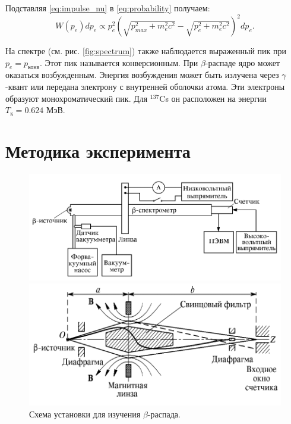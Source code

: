 \documentclass[12pt,a4paper]{article}
\newcommand{\figref}[1]{(см. рис. \ref{#1})}
\begin{document}
	Подставляя \eqref{eq:impulse_nu} в \eqref{eq:probability} получаем:
	\begin{equation}
		W(p_e) dp_e \propto p_e^2 (\sqrt{p_{max}^2 + m_e^2 c^2} - \sqrt{p_e^2 + m_e^2 c^2})^2 dp_e.
	\end{equation}
	
	На спектре \figref{fig:spectrum} также наблюдается выраженный пик при $p_e = p_{\text{конв}}$. Этот пик называется конверсионным. При $\beta$-распаде ядро может оказаться возбужденным. Энергия возбуждения может быть излучена через $\gamma$-квант или передана электрону с внутренней оболочки атома. Эти электроны образуют монохроматический пик. Для $^{137}$Cs он расположен на энергии $T_{\text{к}} = 0.624$ МэВ.
	
	\section*{Методика эксперимента}
	
	\begin{figure}[H]
		\centering
		\begin{minipage}{0.5\textwidth}
			\centering
			\includegraphics[width=1.0\linewidth]{res/setup.png}
		\end{minipage}%
		\begin{minipage}{0.5\textwidth}
			\centering
			\includegraphics[width=1.0\linewidth]{res/scheme.png}
		\end{minipage}
		\caption{Схема установки для изучения $\beta$-распада.}
		\label{fig:setup_scheme}
	\end{figure}
	
\end{document}
